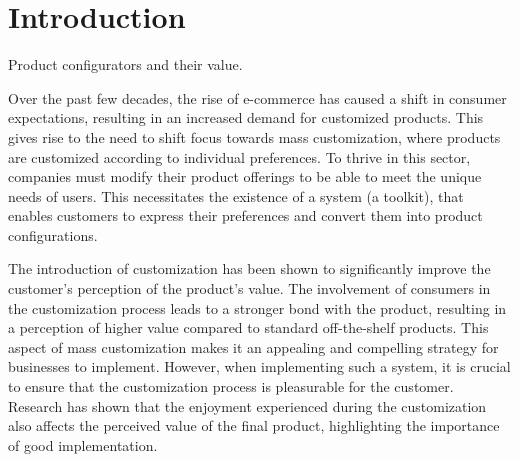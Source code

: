 \chapter*{Introduction}
\setcounter{page}{1}

\begin{chapterabstract}
	Product configurators and their value.
\end{chapterabstract}

Over the past few decades, the rise of e-commerce has caused a shift in consumer expectations, resulting in an increased demand for customized products. This gives rise to the need to shift focus towards mass customization, where products are customized according to individual preferences. To thrive in this sector, companies must modify their product offerings to be able to meet the unique needs of users. This necessitates the existence of a system (a toolkit), that enables customers to express their preferences and convert them into product configurations. \cite{Fulkerson2000}

The introduction of customization has been shown to significantly improve the customer's perception of the product's value. The involvement of consumers in the customization process leads to a stronger bond with the product, resulting in a perception of higher value compared to standard off-the-shelf products. This aspect of mass customization makes it an appealing and compelling strategy for businesses to implement. \cite{Schreier2006} However, when implementing such a system, it is crucial to ensure that the customization process is pleasurable for the customer. Research has shown that the enjoyment experienced during the customization also affects the perceived value of the final product, highlighting the importance of good implementation. \cite{Franke2010}

